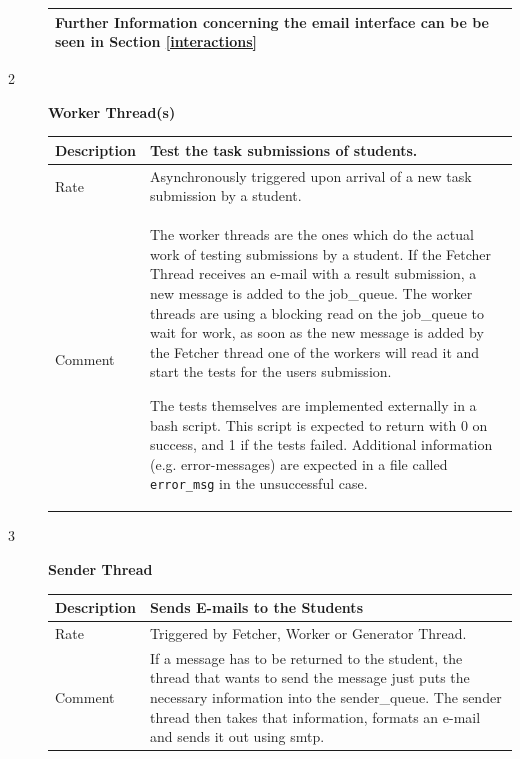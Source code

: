 \begin{description}
\begin{tabular}{|p{2cm}|p{11cm}|}
        Further Information concerning the email interface can be be seen in Section \ref{interactions} 
        \\
        \hline
    \end{tabular}
    \newpage
    \item [2] \textbf{Worker Thread(s)} \\
    \begin{tabular}{|p{2cm}|p{11cm}|}
        \hline
        Description & Test the task submissions of students. \\
        \hline
        Rate & Asynchronously triggered upon arrival of a new task submission by a student. \\
        \hline
        Comment & The worker threads are the ones which do the actual work of testing submissions
        by a student. If the Fetcher Thread receives an e-mail with a result submission, a new
        message is added to the job\_queue. The worker threads are using a blocking read on the
        job\_queue to wait for work, as soon as the new message is added by the Fetcher thread one
        of the workers will read it and start the tests for the users submission.
         
        The tests themselves are implemented externally in a bash script. This script is expected
        to return with 0 on success, and 1 if the tests failed. Additional information
        (e.g. error-messages) are expected in a file called {\tt error\_msg} in the  unsuccessful case.
        \\
        \hline
    \end{tabular}

    \item [3] \textbf{Sender Thread} \\
    \begin{tabular}{|p{2cm}|p{11cm}|}
        \hline
        Description & Sends E-mails to the Students \\
        \hline
        Rate & Triggered by Fetcher, Worker or Generator Thread. \\
        \hline

         Comment & If a message has to be returned to the student, the thread that wants to send the
            message just puts the necessary information into the sender\_queue. The sender thread
            then takes that information, formats an e-mail and sends it out using \gls{smtp}.


\end{tabular}
\end{description}
